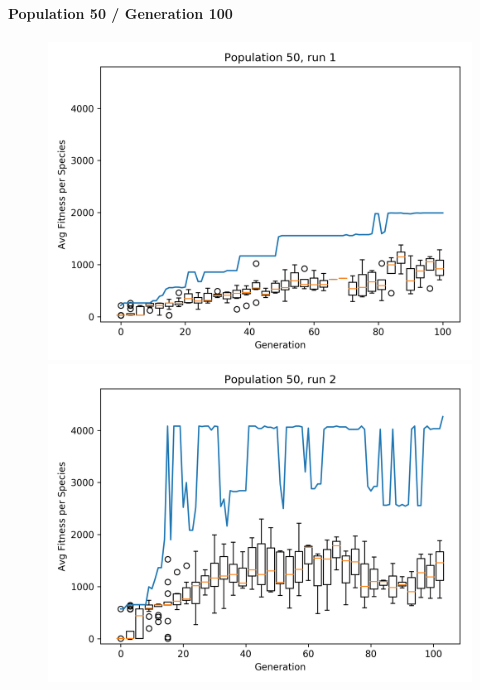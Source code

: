 		\paragraph{Population 50 / Generation 100}
			\label{par:mario50}
			\begin{figure}[h]
				\centering
				\begin{minipage}{0.33\textwidth}
					\centering
					\includegraphics[width=1\textwidth]{graphics/mario/pop50_run1} %
				\end{minipage}\hfill
				\begin{minipage}{0.33\textwidth}
					\centering
					\includegraphics[width=1\textwidth]{graphics/mario/pop50_run2} %

\end{minipage}
\end{figure}
